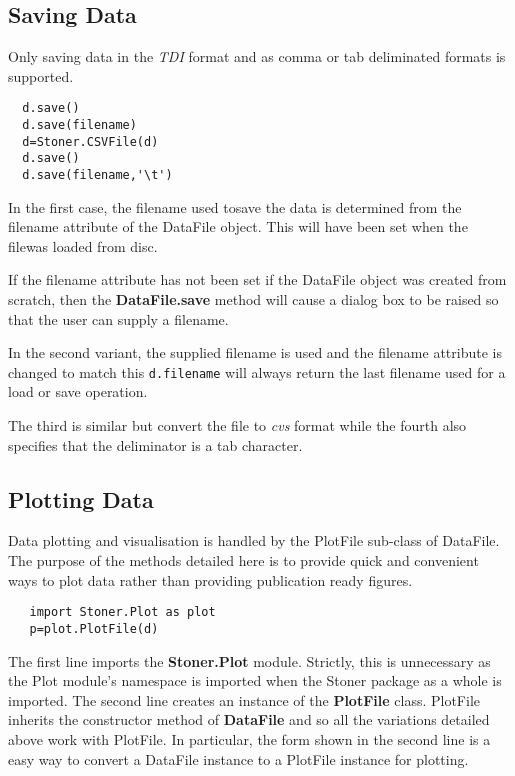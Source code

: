 \documentclass[a4paper,11pt]{scrartcl}
\begin{document}
\subsection{Saving Data}\label{save}

Only saving data in the \textit{TDI} format and as comma or tab deliminated formats is supported.


\begin{lstlisting}
  d.save()
  d.save(filename)
  d=Stoner.CSVFile(d)
  d.save()
  d.save(filename,'\t')
\end{lstlisting}

In the first case, the filename used tosave the data is determined from the
filename attribute of the DataFile object. This will have been set when the
filewas loaded from disc.

If the filename attribute has not been set \eg if the DataFile object was
created from scratch, then the \textbf{DataFile.save} method will cause a dialog
box to be raised so that the user can supply a filename.

In the second variant, the supplied filename is used and the filename attribute
is changed to match this \ie \verb#d.filename# will always return the last
filename used for a load or save operation.

The third is similar but convert the file to \textit{cvs} format while the fourth also specifies that the deliminator is a tab character.

\subsection{Plotting Data}

Data plotting and visualisation is handled by the PlotFile sub-class of DataFile. The purpose of the methods detailed here is to provide quick and convenient ways to plot data rather than providing publication ready figures.

\begin{lstlisting}
   import Stoner.Plot as plot
   p=plot.PlotFile(d)
\end{lstlisting}

The first line imports the \textbf{Stoner.Plot} module. Strictly, this is unnecessary as the Plot module's namespace is imported when the Stoner package as a whole is imported. The second line creates an instance of the \textbf{PlotFile} class. PlotFile inherits the constructor method of \textbf{DataFile} and so all the variations detailed above work with PlotFile. In particular, the form shown in the second line is a easy way to convert a DataFile instance to a PlotFile instance for plotting.
\end{document}
